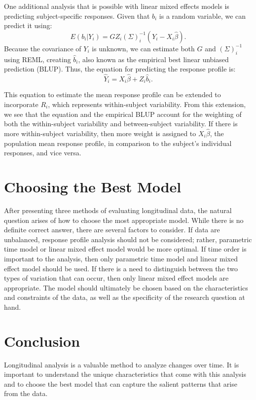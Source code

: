 \documentclass[12pt, twoside]{amherstthesis}
\begin{document}
One additional analysis that is possible with linear mixed effects models is predicting subject-specific responses. Given that \(b_i\) is a random variable, we can predict it using:
\[E(b_i |Y_i) = GZ_i (\Sigma)^{-1}_i(Y_i-X_i\hat\beta).\] Because the covariance of \(Y_i\) is unknown, we can estimate both \(G\) and \((\Sigma)^{-1}_i\) using REML, creating \(\hat b_i\), also known as the empirical best linear unbiased prediction (BLUP). Thus, the equation for predicting the response profile is:
\[\hat Y_i = X_i\hat\beta +Z_i\hat b_i.\]

This equation to estimate the mean response profile can be extended to incorporate \(R_i\), which represents within-subject variability. From this extension, we see that the equation and the empirical BLUP account for the weighting of both the within-subject variability and between-subject variability. If there is more within-subject variability, then more weight is assigned to \(X_i\hat\beta\), the population mean response profile, in comparison to the subject's individual responses, and vice versa.

\hypertarget{choosing-the-best-model}{%
\section{Choosing the Best Model}\label{choosing-the-best-model}}

After presenting three methods of evaluating longitudinal data, the natural question arises of how to choose the most appropriate model. While there is no definite correct answer, there are several factors to consider. If data are unbalanced, response profile analysis should not be considered; rather, parametric time model or linear mixed effect model would be more optimal. If time order is important to the analysis, then only parametric time model and linear mixed effect model should be used. If there is a need to distinguish between the two types of variation that can occur, then only linear mixed effect models are appropriate. The model should ultimately be chosen based on the characteristics and constraints of the data, as well as the specificity of the research question at hand.

\hypertarget{conclusion}{%
\section{Conclusion}\label{conclusion}}

Longitudinal analysis is a valuable method to analyze changes over time. It is important to understand the unique characteristics that come with this analysis and to choose the best model that can capture the salient patterns that arise from the data.
\end{document}
